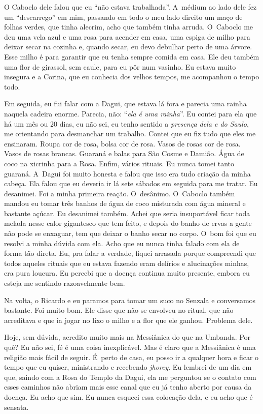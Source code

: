 O Caboclo dele falou que eu ``não estava trabalhada''. A~médium ao lado
dele fez um ``descarrego'' em mim, passando em todo o meu lado direito
um maço de folhas verdes, que tinha alecrim, acho que também tinha
arruda. O~Caboclo me deu uma vela azul e uma rosa para acender em casa,
uma espiga de milho para deixar secar na cozinha e, quando secar, eu
devo debulhar perto de uma árvore. Esse milho é para garantir que eu
tenha sempre comida em casa. Ele deu também uma flor de girassol, sem
caule, para eu pôr num vasinho. Eu estava muito insegura e a Corina, que
eu conhecia dos velhos tempos, me acompanhou o tempo todo.

Em seguida, eu fui falar com a Dagui, que estava lá fora e parecia uma
rainha naquela cadeira enorme. Parecia, não: ``\emph{ela é uma rainha}''.
Eu contei para ela que há um mês ou 20 dias, eu não sei, eu tenho
sentido a \emph{presença dela e do Saulo}, me orientando para desmanchar
um trabalho. Contei que eu fiz tudo que eles me ensinaram. Roupa cor de
rosa, bolsa cor de rosa. Vasos de rosas cor de rosa. Vasos de rosas
brancas. Guaraná e balas para São Cosme e Damião. Água de coco na
xicrinha para a Rosa. Enfim, vários rituais. Eu nunca tomei tanto
guaraná. A~Dagui foi muito honesta e falou que isso era tudo criação da
minha cabeça. Ela falou que eu deveria ir lá sete sábados em seguida
para me tratar. Eu desanimei. Foi a minha primeira reação. O~desânimo. 
O~Caboclo também mandou eu tomar três banhos de água de coco misturada com
água mineral e bastante açúcar. Eu desanimei também. Achei que seria
insuportável ficar toda melada nesse calor gigantesco que tem feito, e
depois do banho de ervas a gente não pode se enxaguar, tem que deixar o
banho secar no corpo. O~bom foi que eu resolvi a minha dúvida com ela.
Acho que eu nunca tinha falado com ela de forma tão direta. Eu, pra
falar a verdade, fiquei arrasada porque compreendi que todos aqueles
rituais que eu estava fazendo eram delírios e alucinações minhas, era
pura loucura. Eu percebi que a doença continua muito presente, embora eu
esteja me sentindo razoavelmente bem.

Na volta, o Ricardo e eu paramos para tomar um suco no Senzala e
conversamos bastante. Foi muito bom. Ele disse que não se envolveu no
ritual, que não acreditava e que ia jogar no lixo o milho e a flor que
ele ganhou. Problema dele.

Hoje, sem dúvida, acredito muito mais na Messiânica do que na Umbanda.
Por quê? Eu não sei, fé é uma coisa inexplicável. Mas é claro que a
Messiânica é uma religião mais fácil de seguir. É~perto de casa, eu
posso ir a qualquer hora e ficar o tempo que eu quiser, ministrando e
recebendo \emph{jhorey}. Eu lembrei de um dia em que, saindo com a Rosa
do Templo da Dagui, ela me perguntou se o contato com esses caminhos não
abriam mais esse canal que eu já tenho aberto por causa da doença. Eu
acho que sim. Eu nunca esqueci essa colocação dela, e eu acho que é
sensata.

